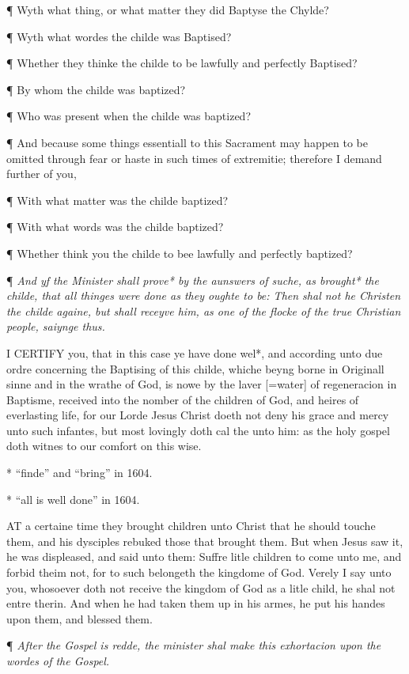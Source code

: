 ¶ Wyth what thing, or what matter they did Baptyse the Chylde?

¶ Wyth what wordes the childe was Baptised?

¶ Whether they thinke the childe to be lawfully and perfectly Baptised?

¶
By whom the childe was baptized?

¶ Who was present when the childe was baptized?

¶ And because some things essentiall to this Sacrament may happen to be
omitted through fear or haste in such times of extremitie; therefore I
demand further of you,

¶ With what matter was the childe baptized?

¶ With what words was the childe baptized?

¶ Whether think you the childe to bee lawfully and perfectly baptized?

¶ \emph{And
yf the Minister shall prove* by the aunswers of suche, as brought* the
childe, that all thinges were done as they oughte to be: Then shal not
he Christen the childe againe, but shall receyve him, as one of the flocke
of the true Christian people, saiynge thus.}

I
CERTIFY you, that in this case ye have done wel*, and according unto due
ordre concerning the Baptising of this childe, whiche beyng borne in Originall
sinne and in the wrathe of God, is nowe by the laver [=water]
of regeneracion in Baptisme, received into the nomber of the children
of God, and heires of everlasting life, for our Lorde Jesus Christ doeth
not deny his grace and mercy unto such infantes, but most lovingly doth
cal the unto him: as the holy gospel doth witnes to our comfort on this
wise.

*
``finde'' and
``bring''
in 1604.

* ``all
is well done''
in 1604.

AT
a certaine time they brought children unto Christ that he should touche
them, and his dysciples rebuked those that brought them. But when Jesus
saw it, he was displeased, and said unto them: Suffre litle children to
come unto me, and forbid theim not, for to such belongeth the kingdome
of God. Verely I say unto you, whosoever doth not receive the kingdom
of God as a litle child, he shal not entre therin. And when he had taken
them up in his armes, he put his handes upon them, and blessed them.

¶
\emph{After the Gospel is redde, the minister shal make this exhortacion
upon the wordes of the Gospel.}


